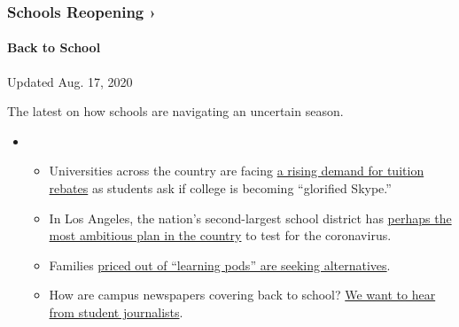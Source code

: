 \href{https://www.nytimes.com/spotlight/schools-reopening?action=click\&pgtype=Article\&state=default\&region=MAIN_CONTENT_3\&context=storylines_keepup}{}

\hypertarget{schools-reopening-}{%
\subsubsection{Schools Reopening ›}\label{schools-reopening-}}

\hypertarget{back-to-school}{%
\paragraph{Back to School}\label{back-to-school}}

Updated Aug. 17, 2020

The latest on how schools are navigating an uncertain season.

\begin{itemize}
\item
  \begin{itemize}
  \tightlist
  \item
    Universities across the country are facing
    \href{https://www.nytimes.com/2020/08/15/us/covid-college-tuition.html?action=click\&pgtype=Article\&state=default\&region=MAIN_CONTENT_3\&context=storylines_keepup}{a
    rising demand for tuition rebates} as students ask if college is
    becoming ``glorified Skype.''
  \item
    In Los Angeles, the nation's second-largest school district has
    \href{https://www.nytimes.com/2020/08/16/us/los-angeles-schools-virus-testing.html?action=click\&pgtype=Article\&state=default\&region=MAIN_CONTENT_3\&context=storylines_keepup}{perhaps
    the most ambitious plan in the country} to test for the coronavirus.
  \item
    Families
    \href{https://www.nytimes.com/2020/08/14/us/covid-schools-learning-pods.html?action=click\&pgtype=Article\&state=default\&region=MAIN_CONTENT_3\&context=storylines_keepup}{priced
    out of ``learning pods'' are seeking alternatives}.
  \item
    How are campus newspapers covering back to school?
    \href{https://www.nytimes.com/2020/08/17/us/student-newspaper-schools-reopening.html?action=click\&pgtype=Article\&state=default\&region=MAIN_CONTENT_3\&context=storylines_keepup}{We
    want to hear from student journalists}.
  \end{itemize}
\end{itemize}

